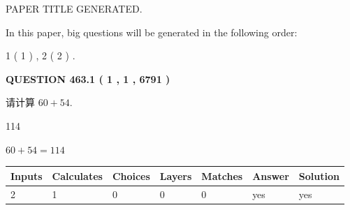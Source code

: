 \documentclass{ctexart}
\begin{document}
   
 \vspace{0.2in}
 
 
 
 
   
   
 PAPER TITLE GENERATED.
   
   
   
\vspace{0.2in}
   
In this paper, big questions will be generated in the following order: 
   
   
   1 ( 1 )
 ,
   2 ( 2 )
 .
  
\vspace{0.2in}
  
{\textbf{\Large{QUESTION
463.1 
 ( 1 , 1 , 6791 )
}}}
  
  
 
请计算 $ %
60 +  %
54 $.
 
 
 
\noindent{}
 
 

114
 
 
\noindent{}
 
 

 
 
 
\noindent{}
 
 

$ %
60 +  %
54=   %
114$
 
 
\noindent{}
 
 

 
   
   
   
   
\noindent\begin{tabular}{|l|l|l|l|l|l|l|}
 \hline
Inputs & Calculates & Choices & Layers & Matches & Answer & Solution \\ \hline
 2  & 
 1  & 
 0
  & 
 0  & 
 0  & 
  yes & 
  yes 
  \\ \hline
 \end{tabular}
   
   
   
   
\noindent{}
   
   
  
\end{document}
